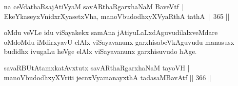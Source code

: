 \begin{shl}
na ceVdathaRsajAtiVyaM savARthaRgarxhaNaM BaveVtf |
EkeYkaseyxVnidxrXyasetxVha, manoVbudodhxyXVyaRthA tathA \hfill || 365 ||
\end{shl}

\begin{artha}
oMdu veVLe idu viSayakekx samAna jAtiyuLaLxdAguvudilalxveMdare oMdoMdu iMdirxyavU elAlx viSayavanunx garxhisabeVkAguvudu manasusx budidhx ivugaLu heVge elAlx viSayavanunx garxhisuvudo hAge.
\end{artha}


\begin{shl}
savaRBUtAtamxkatAvxtutx savARthaRgarxhaNaM tayoVH |
manoVbudodhxyXVriti jecnxVyamanayxthA tadasaMBavAtf \hfill || 366 ||
\end{shl}

